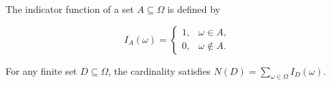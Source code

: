 The indicator function of a set $A \subseteq \Omega$ is defined by

$$I_A(\omega) = \begin{cases} 1, & \omega \in A, \\ 0, & \omega \notin A. \end{cases}$$

For any finite set $D \subseteq \Omega$, the cardinality satisfies $N(D) = \sum_{\omega \in \Omega} I_D(\omega)$.
